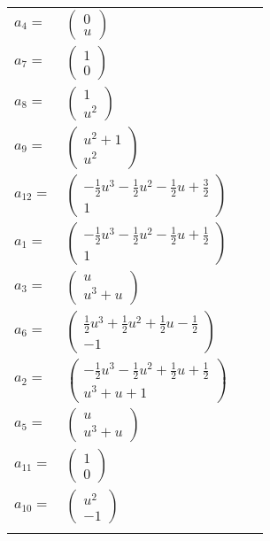 \documentclass[1p]{elsarticle_modified}
\theoremstyle{definition}
\begin{document}
\begin{tabular}{m{7pt} m{180pt} m{7pt} m{180pt} }
\flushright $a_{4}=$&$\begin{pmatrix}0\\u\end{pmatrix}$ \\
\flushright $a_{7}=$&$\begin{pmatrix}1\\0\end{pmatrix}$ \\
\flushright $a_{8}=$&$\begin{pmatrix}1\\u^2\end{pmatrix}$ \\
\flushright $a_{9}=$&$\begin{pmatrix}u^2+1\\u^2\end{pmatrix}$ \\
\flushright $a_{12}=$&$\begin{pmatrix}-\frac{1}{2} u^3-\frac{1}{2} u^2-\frac{1}{2} u+\frac{3}{2}\\1\end{pmatrix}$ \\
\flushright $a_{1}=$&$\begin{pmatrix}-\frac{1}{2} u^3-\frac{1}{2} u^2-\frac{1}{2} u+\frac{1}{2}\\1\end{pmatrix}$ \\
\flushright $a_{3}=$&$\begin{pmatrix}u\\u^3+u\end{pmatrix}$ \\
\flushright $a_{6}=$&$\begin{pmatrix}\frac{1}{2} u^3+\frac{1}{2} u^2+\frac{1}{2} u-\frac{1}{2}\\-1\end{pmatrix}$ \\
\flushright $a_{2}=$&$\begin{pmatrix}-\frac{1}{2} u^3-\frac{1}{2} u^2+\frac{1}{2} u+\frac{1}{2}\\u^3+u+1\end{pmatrix}$ \\
\flushright $a_{5}=$&$\begin{pmatrix}u\\u^3+u\end{pmatrix}$ \\
\flushright $a_{11}=$&$\begin{pmatrix}1\\0\end{pmatrix}$ \\
\flushright $a_{10}=$&$\begin{pmatrix}u^2\\-1\end{pmatrix}$\\&\end{tabular}
\end{document}
